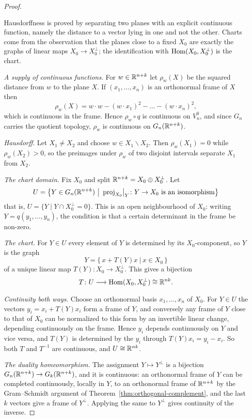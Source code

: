 \begin{proof}
\begin{strategy}
Hausdorffness is proved by separating two planes with an explicit continuous
function, namely the distance to a vector lying in one and not the other.
Charts come from the observation that the planes close to a fixed $X_0$ are
exactly the graphs of linear maps $X_0\to X_0^\perp$; the identification with
$\operatorname{Hom}(X_0,X_0^\perp)$ is the chart.
\end{strategy}

 \emph{A supply of continuous functions.} For $w\in\mathbb{R}^{n+k}$ let
$\rho_w(X)$ be the squared distance from $w$ to the plane $X$. If
$(x_1,\dots,x_n)$ is an orthonormal frame of $X$ then
\[
\rho_w(X)=w\cdot w-(w\cdot x_1)^2-\dots-(w\cdot x_n)^2,
\]
which is continuous in the frame. Hence $\rho_w\circ q$ is continuous on
$V^0_n$, and since $G_n$ carries the quotient topology, $\rho_w$ is continuous
on $G_n(\mathbb{R}^{n+k})$.

 \emph{Hausdorff.} Let $X_1\neq X_2$ and choose
$w\in X_1\smallsetminus X_2$. Then $\rho_w(X_1)=0$ while $\rho_w(X_2)>0$, so the
preimages under $\rho_w$ of two disjoint intervals separate $X_1$ from $X_2$.

 \emph{The chart domain.} Fix $X_0$ and split
$\mathbb{R}^{n+k}=X_0\oplus X_0^{\perp}$. Let
\[
U=\big\{Y\in G_n(\mathbb{R}^{n+k})\ \big|\
\operatorname{proj}_{X_0}\!\big|_Y\colon Y\to X_0 \text{ is an isomorphism}\big\}
\]
that is, $U=\{Y\mid Y\cap X_0^{\perp}=0\}$. This is
an open neighbourhood of $X_0$: writing $Y=q(y_1,\dots,y_n)$, the condition is
that a certain determinant in the frame be non-zero.

 \emph{The chart.} For $Y\in U$ every element of $Y$ is determined by
its $X_0$-component, so $Y$ is the graph
\[
Y=\big\{\,x+T(Y)x\ \big|\ x\in X_0\,\big\}
\]
of a unique linear map $T(Y)\colon X_0\to X_0^\perp$. This gives a bijection
\[
T\colon U\longrightarrow\operatorname{Hom}(X_0,X_0^\perp)\cong\mathbb{R}^{nk}.
\]

 \emph{Continuity both ways.} Choose an orthonormal basis
$x_1,\dots,x_n$ of $X_0$. For $Y\in U$ the vectors $y_i=x_i+T(Y)x_i$ form a
frame of $Y$, and conversely any frame of $Y$ close to that of $X_0$ can be
normalized to this form by an invertible linear change, depending continuously
on the frame. Hence $y_i$ depends continuously on $Y$ and vice versa, and
$T(Y)$ is determined by the $y_i$ through $T(Y)x_i=y_i-x_i$. So both $T$ and
$T^{-1}$ are continuous, and $U\cong\mathbb{R}^{nk}$.

 \emph{The duality homeomorphism.} The assignment $Y\mapsto Y^{\perp}$
is a bijection $G_n(\mathbb{R}^{n+k})\to G_k(\mathbb{R}^{n+k})$, and it is continuous: an
orthonormal frame of $Y$ can be completed continuously, locally in $Y$, to an
orthonormal frame of $\mathbb{R}^{n+k}$ by the Gram--Schmidt argument of
Theorem~\ref{thm:orthogonal-complement}, and the last $k$ vectors give a frame
of $Y^\perp$. Applying the same to $Y^\perp$ gives continuity of the inverse.
\end{proof}


